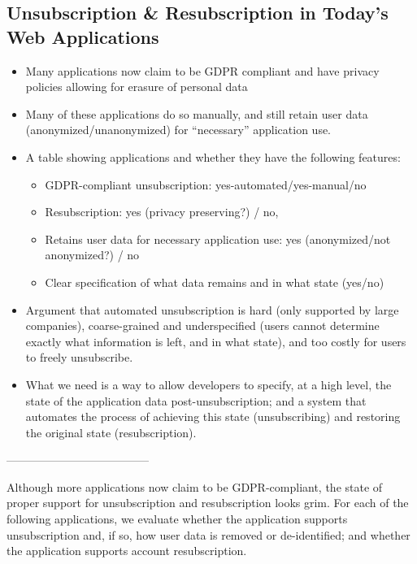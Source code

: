 \subsection{Unsubscription \& Resubscription in Today's Web Applications}
\begin{itemize}
    \item Many applications now claim to be GDPR compliant and have privacy policies allowing for
    erasure of personal data 
    \item Many of these applications do so manually, and still retain user data
    (anonymized/unanonymized) for ``necessary'' application use.
    \item A table showing applications and whether they have the following features: 
    \begin{itemize}
        \item GDPR-compliant unsubscription: yes-automated/yes-manual/no
        \item Resubscription: yes (privacy preserving?) / no, 
        \item Retains user data for necessary application use: yes (anonymized/not anonymized?) / no
        \item Clear specification of what data remains and in what state (yes/no)
    \end{itemize}
    \item Argument that automated unsubscription is hard (only supported by large companies),
    coarse-grained and underspecified (users cannot determine exactly what information is left, and
    in what state), and too costly for users to freely unsubscribe. 
    \item What we need is a way to allow developers to specify, at a high level, the state of the
    application data post-unsubscription; and a system that automates the process of achieving this
    state (unsubscribing) and restoring the original state (resubscription).
\end{itemize}

--------------------------------------

Although more applications now claim to be GDPR-compliant, the state of proper support for
unsubscription and resubscription looks grim. For each of the following applications, we evaluate
whether the application supports unsubscription and, if so, how user data is removed or
de-identified; and whether the application supports account resubscription.

